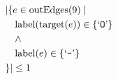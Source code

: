 \begin{align*}
&|\{e \in \mathrm{outEdges}(9)  \mid \\
&\quad \mathrm{label}(\mathrm{target}(e)) \in \{ \text{`\texttt{O}'} \}\\
&\quad \wedge\\
&\quad \mathrm{label}(e) \in \{ \text{`\texttt{-}'} \}\\
&\}| \leq 1
\end{align*}


